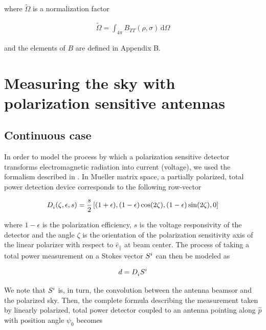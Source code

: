 \documentclass[a4paper,11pt]{article}
\newcommand{\co}{\mathbin{\|}}
\begin{document}
\noindent
where $\tilde{\Omega}$ is a normalization factor

\begin{equation}
\begin{aligned}
\tilde{\Omega} = \int_{4\pi} B_{TT}(\rho,\sigma) \, \mathrm{d} \Omega
\end{aligned}
\end{equation}

\noindent
and the elements of $B$ are defined in Appendix B. 

\section{Measuring the sky with polarization sensitive antennas}

\subsection{Continuous case}

In order to model the process by which a polarization sensitive detector transforms electromagnetic radiation into current (voltage), we used the formalism described in \cite{2007MNRAS.376.1767O}. In Mueller matrix space, a partially polarized, total power detection device corresponds to the following row-vector 

\begin{equation}
\begin{aligned}
\tensor{D}{_{i}}(\zeta,\epsilon,s) = \frac{s}{2} \left[(1 + \epsilon), (1 - \epsilon)\cos(2\zeta), (1 - \epsilon)\sin(2\zeta), 0 \right]
\end{aligned}
\label{eq::M_pol}
\end{equation}

\noindent
where $1 - \epsilon$ is the polarization efficiency, $s$ is the voltage responsivity of the detector and the angle $\zeta$ is the orientation of the polarization sensitivity axis of the linear polarizer with respect to $\hat{e}_{\co}$ at beam center. The process of taking a total power measurement on a Stokes vector $\tensor{S}{^{i}}$ can then be modeled as

\begin{equation}
\begin{aligned}
d = \tensor{D}{_{i}} \tensor{S}{^{i}}
\end{aligned}
\label{eq::total_power_measurement}
\end{equation}

We note that $\tensor{S}{^{i}}$ is, in turn, the convolution between the antenna beamsor and the polarized sky. Then, the complete formula describing the measurement taken by linearly polarized, total power detector coupled to an antenna pointing along $\hat{p}$ with position angle $\psi_0$ becomes
\end{document}
